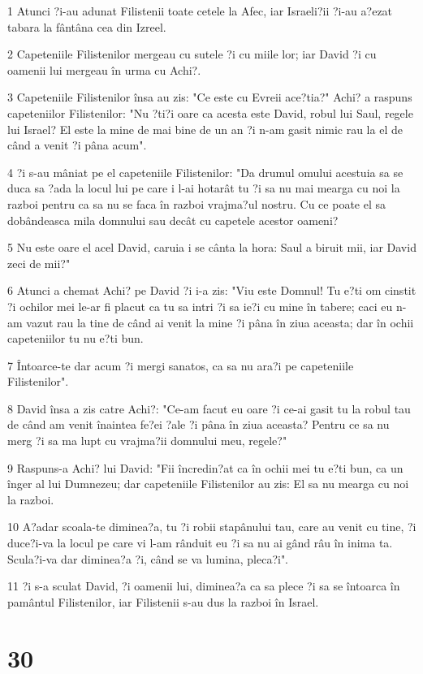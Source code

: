 \par 1 Atunci ?i-au adunat Filistenii toate cetele la Afec, iar Israeli?ii ?i-au a?ezat tabara la fântâna cea din Izreel.
\par 2 Capeteniile Filistenilor mergeau cu sutele ?i cu miile lor; iar David ?i cu oamenii lui mergeau în urma cu Achi?.
\par 3 Capeteniile Filistenilor însa au zis: "Ce este cu Evreii ace?tia?" Achi? a raspuns capeteniilor Filistenilor: "Nu ?ti?i oare ca acesta este David, robul lui Saul, regele lui Israel? El este la mine de mai bine de un an ?i n-am gasit nimic rau la el de când a venit ?i pâna acum".
\par 4 ?i s-au mâniat pe el capeteniile Filistenilor: "Da drumul omului acestuia sa se duca sa ?ada la locul lui pe care i l-ai hotarât tu ?i sa nu mai mearga cu noi la razboi pentru ca sa nu se faca în razboi vrajma?ul nostru. Cu ce poate el sa dobândeasca mila domnului sau decât cu capetele acestor oameni?
\par 5 Nu este oare el acel David, caruia i se cânta la hora: Saul a biruit mii, iar David zeci de mii?"
\par 6 Atunci a chemat Achi? pe David ?i i-a zis: "Viu este Domnul! Tu e?ti om cinstit ?i ochilor mei le-ar fi placut ca tu sa intri ?i sa ie?i cu mine în tabere; caci eu n-am vazut rau la tine de când ai venit la mine ?i pâna în ziua aceasta; dar în ochii capeteniilor tu nu e?ti bun.
\par 7 Întoarce-te dar acum ?i mergi sanatos, ca sa nu ara?i pe capeteniile Filistenilor".
\par 8 David însa a zis catre Achi?: "Ce-am facut eu oare ?i ce-ai gasit tu la robul tau de când am venit înaintea fe?ei ?ale ?i pâna în ziua aceasta? Pentru ce sa nu merg ?i sa ma lupt cu vrajma?ii domnului meu, regele?"
\par 9 Raspuns-a Achi? lui David: "Fii încredin?at ca în ochii mei tu e?ti bun, ca un înger al lui Dumnezeu; dar capeteniile Filistenilor au zis: El sa nu mearga cu noi la razboi.
\par 10 A?adar scoala-te diminea?a, tu ?i robii stapânului tau, care au venit cu tine, ?i duce?i-va la locul pe care vi l-am rânduit eu ?i sa nu ai gând râu în inima ta. Scula?i-va dar diminea?a ?i, când se va lumina, pleca?i".
\par 11 ?i s-a sculat David, ?i oamenii lui, diminea?a ca sa plece ?i sa se întoarca în pamântul Filistenilor, iar Filistenii s-au dus la razboi în Israel.

\chapter{30}

